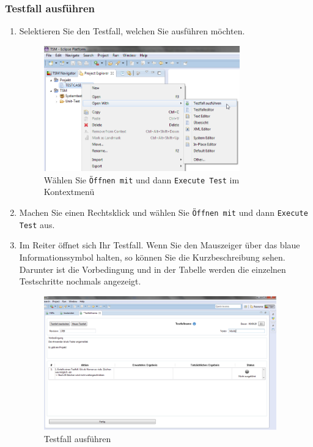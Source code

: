 \documentclass[11pt,a4paper,titlepage]{article}
\begin{document}
\subsubsection{Testfall ausführen}
\begin{enumerate}
\item Selektieren Sie den Testfall, welchen Sie ausführen möchten.

\begin{figure}[H]
\centering
\includegraphics[width= 320px]{BilderHandbuch/Testfall/OpenWith2.png}
\caption{Wählen Sie \texttt{Öffnen mit} und dann \texttt{Execute Test} im Kontextmenü}
\label{fig:OpenWith2}
\end{figure}

\item Machen Sie einen Rechtsklick und wählen Sie \texttt{Öffnen mit} und dann \texttt{Execute Test} aus.
\item Im Reiter öffnet sich Ihr Testfall.
Wenn Sie den Mauszeiger über das blaue Informationssymbol halten, so können Sie die Kurzbeschreibung sehen.
\\
Darunter ist die Vorbedingung und in der Tabelle werden die einzelnen Testschritte nochmals angezeigt.

\begin{figure}[H]
\centering
\includegraphics[width= 380px]{BilderHandbuch/Testfall/Ausfuehren.png}
\caption{Testfall ausführen}
\label{fig:Ausfuehren}
\end{figure}


\end{enumerate}
\end{document}
